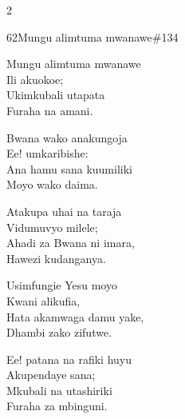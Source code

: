 \documentclass{article}
\begin{document}
\begin{multicols}{2}
\begin{hymn}{62}{Mungu alimtuma mwanawe}{\#134}
\begin{stanza}
Mungu alimtuma mwanawe\\
Ili akuokoe;\\
Ukimkubali utapata\\
Furaha na amani.
\end{stanza}
\begin{chorus}
Bwana wako anakungoja\\
Ee! umkaribishe:\\
Ana hamu sana kuumiliki\\
Moyo wako daima.
\end{chorus}
\begin{stanza}
Atakupa uhai na taraja\\
Vidumuvyo milele;\\
Ahadi za Bwana ni imara,\\
Hawezi kudanganya.
\end{stanza}
\begin{stanza}
Usimfungie Yesu moyo\\
Kwani alikufia,\\
Hata akamwaga damu yake,\\
Dhambi zako zifutwe.
\end{stanza}
\begin{stanza}
Ee! patana na rafiki huyu\\
Akupendaye sana;\\
Mkubali na utashiriki\\
Furaha za mbinguni.
\end{stanza}
\end{hymn}


\end{multicols}
\end{document}
